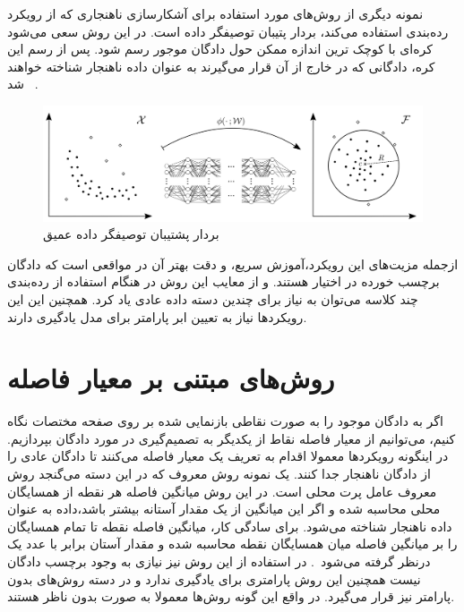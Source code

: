 \documentclass[12pt,a4paper]{report}
\theoremstyle{definition}
\theoremstyle{definition}
\begin{document}
نمونه دیگری از روش‌های مورد استفاده برای آشکارسازی ناهنجاری که از رویکرد رده‌بندی استفاده می‌کند، بردار پتیبان توصیفگر داده‌ است. در این روش سعی می‌شود کره‌ای با کوچک ترین اندازه ممکن حول دادگان موجور رسم شود. پس از رسم این کره، دادگانی که در خارج از آن قرار می‌گیرند به عنوان داده ناهنجار شناخته خواهند شد~\cite{pmlr-v80-ruff18a} .
\begin{figure}[!h]
	\begin{center}
		\includegraphics[width=\linewidth]{./images/figures/deep-svdd.png}
	\end{center}
	\caption{بردار پشتیبان توصیفگر داده عمیق~\cite{pmlr-v80-ruff18a}}
	\label{fig:deep-svdd}
	\centering
\end{figure}

ازجمله مزیت‌های این رویکرد،‌آموزش سریع، و دقت بهتر آن در مواقعی است که دادگان برچسب خورده در اختیار هستند. و از معایب این روش در هنگام استفاده از رده‌بندی چند کلاسه می‌توان به نیاز برای چندین دسته داده عادی یاد کرد. همچنین این این رویکرد‌ها نیاز به تعیین ابر پارامتر برای مدل یادگیری دارند.

\section{روش‌های مبتنی بر معیار فاصله}
اگر به دادگان موجود را به صورت نقاطی بازنمایی شده بر روی صفحه مختصات نگاه کنیم،‌ می‌توانیم از معیار فاصله نقاط از یکدیگر به تصمیم‌گیری در مورد دادگان بپردازیم. در اینگونه رویکرد‌ها معمولا اقدام به تعریف یک معیار فاصله می‌کنند تا دادگان عادی را از دادگان ناهنجار جدا کنند. یک نمونه روش معروف که در این دسته می‌گنجد روش معروف عامل پرت محلی است. در این روش میانگین فاصله هر نقطه از همسایگان محلی محاسبه شده و اگر این میانگین از یک مقدار آستانه بیشتر باشد،‌داده به عنوان داده ناهنجار شناخته می‌شود. برای سادگی کار، میانگین فاصله نقطه تا تمام همسایگان را بر میانگین فاصله میان همسایگان نقطه محاسبه شده و مقدار آستان برابر با عدد یک درنظر گرفته می‌شود~\cite{10.1145/342009.335388}. در استفاده از این روش نیز نیازی به وجود برچسب دادگان نیست همچنین این روش پارامتری برای یادگیری ندارد و در دسته روش‌های بدون پارامتر نیز قرار می‌گیرد. در واقع این گونه روش‌ها معمولا به صورت بدون ناظر هستند.
\end{document}
